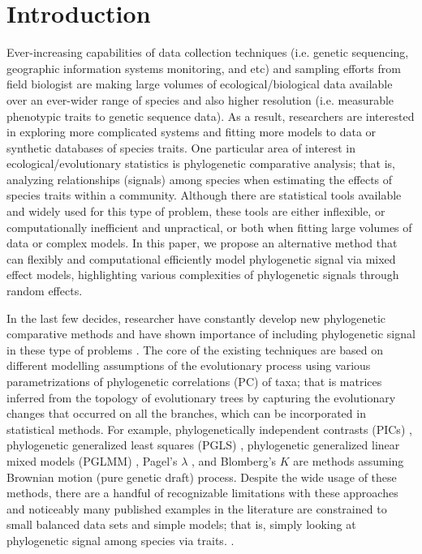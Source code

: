 \section{Introduction}

Ever-increasing capabilities of data collection techniques (i.e. genetic sequencing, geographic information systems monitoring, and etc) and sampling efforts from field biologist are making large volumes of ecological/biological data available over an ever-wider range of species and also higher resolution (i.e. measurable phenotypic traits to genetic sequence data). 
As a result, researchers are interested in exploring more complicated systems and fitting more models to data or synthetic databases of species traits.
One particular area of interest in ecological/evolutionary statistics is phylogenetic comparative analysis; that is, analyzing relationships (signals) among species when estimating the effects of species traits within a community. 
Although there are statistical tools available and widely used for this type of problem, these tools are either inflexible, or computationally inefficient and unpractical, or both when fitting large volumes of data or complex models.
In this paper, we propose an alternative method that can flexibly and computational efficiently model phylogenetic signal via mixed effect models, highlighting various complexities of phylogenetic signals through random effects.  

In the last few decides, researcher have constantly develop new phylogenetic comparative methods and have shown importance of including phylogenetic signal in these type of problems \cite{felsenstein1985phylogenies, li2017statistical}. 
The core of the existing techniques are based on different modelling assumptions of the evolutionary process using various parametrizations of phylogenetic correlations (PC) of taxa; that is matrices inferred from the topology of evolutionary trees by capturing the evolutionary changes that occurred on all the branches, which can be incorporated in statistical methods. 
For example, phylogenetically independent contrasts (PICs) \citep{felsenstein1985phylogenies}, phylogenetic generalized least squares (PGLS) \citep{grafen1989phylogenetic}, phylogenetic generalized linear mixed models (PGLMM) \citep{ives2011generalized}, Pagel's $\lambda$ \citep{pagel1999inferring}, and Blomberg's $K$ \citep{blomberg2003testing} are methods assuming Brownian motion (pure genetic draft) process. 
Despite the wide usage of these methods, there are a handful of recognizable limitations with these approaches and noticeably many published examples in the literature are constrained to small balanced data sets and simple models; that is, simply looking at phylogenetic signal among species via traits. \citep{li2017canfun, freckleton2002phylogenetic}.

